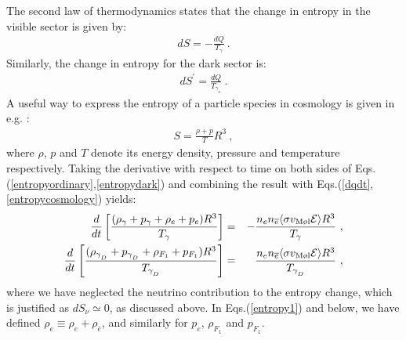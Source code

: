 \documentclass[12pt]{article}
\begin{document}
The second law of thermodynamics states that the change in entropy in
the visible sector is given by:
%
\begin{eqnarray}
dS = -\frac{dQ}{T _{\gamma}} \ .
\label{entropyordinary}
\end{eqnarray}
%
Similarly, the change in entropy for the dark sector is:
%
\begin{eqnarray}
dS ^{'} = \frac{dQ}{T _{\gamma _{_D}}} \ .
\label{entropydark}
\end{eqnarray}
%
A useful way to express the entropy of a particle species in cosmology
is given in e.g. \cite{earlyuniverse}:
%
\begin{eqnarray}
S = \frac{\rho + p}{T}R^3 \ ,
\label{entropycosmology}
\end{eqnarray}
%
where $\rho$, $p$ and $T$ denote its energy density, pressure and
temperature respectively. Taking the derivative with respect to time on
both sides of Eqs.(\ref{entropyordinary},\ref{entropydark}) and
combining the result with Eqs.(\ref{dqdt},\ref{entropycosmology})
yields:
%
\begin{eqnarray}
\frac{d}{dt} \left [ \frac{(\rho _{\gamma} + p _{\gamma} + \rho _e + p
_e)R^3}{T _{\gamma}}\right ] 
&=& - \frac{n _e n _{\overline{e}} \langle \sigma v_{\text{M\o l}} {\cal
E} \rangle R^3}{T _{\gamma}} \ , \nonumber \\
\frac{d}{dt} \left [ \frac{(\rho _{\gamma _{_D}} + p _{\gamma _{_D}} +
\rho _{F_1} + p _{F_1})R^3}{T _{\gamma _{_D}}}\right ] 
&=& \frac{n _e n _{\overline{e}} \langle \sigma v_{\text{M\o l}} {\cal
E} \rangle R^3}{T _{\gamma _{_D}}} \ ,
\label{entropy1}
\end{eqnarray}
%
where we have neglected the neutrino contribution to the entropy change,
which is justified as $dS _{\nu} \simeq 0$, as discussed above. In
Eqs.(\ref{entropy1}) and below, we have defined $\rho _e \equiv \rho _e
+ \rho _{\bar{e}}$, and similarly for $p _e$, $\rho _{F_1}$ and $p
_{F_1}$.
\end{document}
